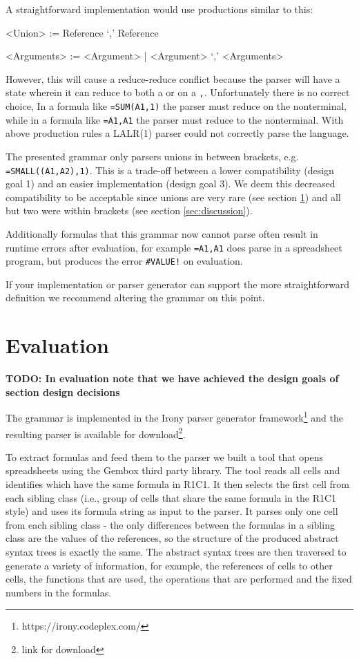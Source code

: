 \documentclass[conference]{IEEEtran}
\newcommand{\todo}[1]{\textbf{TODO: #1}}
\begin{document}
A straightforward implementation would use productions similar to this:

\begin{grammar}
<Union> := Reference `,' Reference

<Arguments> := <Argument> | <Argument> `,' <Arguments>
\end{grammar}

However, this will cause a reduce-reduce conflict because the parser will have a state wherein it can reduce to both a  or  on a \texttt{,}.
Unfortunately there is no correct choice, In a formula like \texttt{=SUM(A1,1)} the parser must reduce on the  nonterminal, while in a formula like \texttt{=A1,A1} the parser must reduce to the  nonterminal.
With above production rules a LALR(1) parser could not correctly parse the language.

The presented grammar only parsers unions in between brackets, e.g. \texttt{=SMALL((A1,A2),1)}.
This is a trade-off between a lower compatibility (design goal 1) and an easier implementation (design goal 3).
We deem this decreased compatibility to be acceptable since unions are very rare (see section \ref{sec:evaluation}) and all but two were within brackets (see section \ref{sec:discussion}).

Additionally formulas that this grammar now cannot parse often result in runtime errors after evaluation, for example \texttt{=A1,A1} does parse in a spreadsheet program, but produces the error \texttt{\#VALUE!} on evaluation.

If your implementation or parser generator can support the more straightforward definition we recommend altering the grammar on this point.


\section{Evaluation}
\label{sec:evaluation}

\todo{In evaluation note that we have achieved the design goals of section design decisions}

The grammar is implemented in the Irony parser generator framework\footnote{https://irony.codeplex.com/} and the resulting parser is available for download\footnote{link for download}.

To extract formulas and feed them to the parser we built a tool that opens spreadsheets using the Gembox third party library. The tool reads all cells and identifies which have the same formula in R1C1. It then selects the first cell from each sibling class (i.e., group of cells that share the same formula in the R1C1 style) and uses its formula string as input to the parser. It parses only one cell from each sibling class - the only differences between the formulas in a sibling class are the values of the references, so the structure of the produced abstract syntax trees is exactly the same. The abstract syntax trees are then traversed to generate a variety of information, for example, the references of cells to other cells, the functions that are used, the operations that are performed and the fixed numbers in the formulas.
\end{document}
